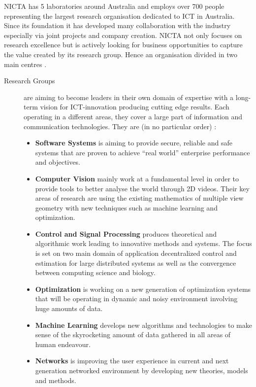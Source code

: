 \documentclass[10pt]{article}
\begin{document}
NICTA has 5 laboratories around Australia and employs over 700 people representing the largest research organisation dedicated to ICT in Australia. Since its foundation it has developed many collaboration with the industry especially via joint projects and company creation. NICTA not only focuses on research excellence but is actively looking for business opportunities to capture the value created by its research group. Hence an organisation divided in two main centres \autocite{PresentationBooklet}.

\begin{description}
\item[Research Groups] are aiming to become leaders in their own domain of expertise with a long-term vision for ICT-innovation producing cutting edge results. Each operating in a different areas, they cover a large part of information and communication technologies. They are (in no particular order) :
\begin{itemize}
\item \textbf{Software Systems} is aiming to provide secure, reliable and safe systems that are proven to achieve \enquote{real world} enterprise performance and objectives. 
\item \textbf{Computer Vision} mainly work at a fundamental level in order to provide tools to better analyse the world through 2D videos. Their key areas of research are using the existing mathematics of multiple view geometry with new techniques such as machine learning and optimization.
\item \textbf{Control and Signal Processing} produces theoretical and algorithmic work leading to innovative methods and systems. The focus is set on two main domain of application decentralized control and estimation for large distributed systems as well as the convergence between computing science and biology.
\item \textbf{Optimization} is working on a new generation of optimization systems that will be operating in dynamic and noisy environment involving huge amounts of data.
\item \textbf{Machine Learning} develops new algorithms and technologies to make sense of the skyrocketing amount of data gathered in all areas of human endeavour. 
\item \textbf{Networks} is improving the user experience in current and next generation networked environment by developing new theories, models and methods.
\end{itemize}


\end{description}
\end{document}
